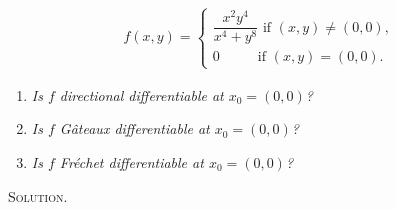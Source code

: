 \documentclass[a4paper]{article}
\numberwithin{equation}{section}
\begin{document}
\begin{align}
f\left( {x,y} \right) = \left\{ {\begin{array}{*{20}{c}}
{\dfrac{{{x^2}{y^4}}}{{{x^4} + {y^8}}}\mbox{ if }\left( {x,y} \right) \ne \left( {0,0} \right),}\\
{0 \hspace{1cm}\mbox{ if } \left( {x,y} \right) = \left( {0,0} \right).}
\end{array}} \right.
\end{align}
\begin{enumerate}
\item \textit{Is $f$ directional differentiable at $x_0 =\left(0,0\right)$?}
\item \textit{Is $f$ G\^{a}teaux differentiable at $x_0 =\left(0,0\right)$?}
\item \textit{Is $f$ Fr\'{e}chet differentiable at $x_0=\left(0,0\right)$?}
\end{enumerate}
\textsc{Solution.} 
\end{document}
